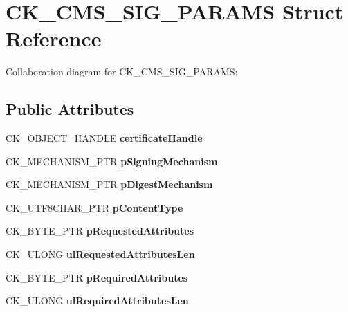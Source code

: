 \hypertarget{struct_c_k___c_m_s___s_i_g___p_a_r_a_m_s}{}\section{C\+K\+\_\+\+C\+M\+S\+\_\+\+S\+I\+G\+\_\+\+P\+A\+R\+A\+MS Struct Reference}
\label{struct_c_k___c_m_s___s_i_g___p_a_r_a_m_s}


Collaboration diagram for C\+K\+\_\+\+C\+M\+S\+\_\+\+S\+I\+G\+\_\+\+P\+A\+R\+A\+MS\+:
\subsection*{Public Attributes}
\begin{DoxyCompactItemize}
\item 
\mbox{\label{struct_c_k___c_m_s___s_i_g___p_a_r_a_m_s_af159e64a054b24fafda6eb8187d5177c}} 
C\+K\+\_\+\+O\+B\+J\+E\+C\+T\+\_\+\+H\+A\+N\+D\+LE {\bfseries certificate\+Handle}
\item 
\mbox{\label{struct_c_k___c_m_s___s_i_g___p_a_r_a_m_s_a1b49871315d18fd726c6871cd971236c}} 
C\+K\+\_\+\+M\+E\+C\+H\+A\+N\+I\+S\+M\+\_\+\+P\+TR {\bfseries p\+Signing\+Mechanism}
\item 
\mbox{\label{struct_c_k___c_m_s___s_i_g___p_a_r_a_m_s_a63ba4f2d4e7be8d102e93a286a1d7877}} 
C\+K\+\_\+\+M\+E\+C\+H\+A\+N\+I\+S\+M\+\_\+\+P\+TR {\bfseries p\+Digest\+Mechanism}
\item 
\mbox{\label{struct_c_k___c_m_s___s_i_g___p_a_r_a_m_s_a677aa9778cdf65f7ddd4ce4d687bb2dd}} 
C\+K\+\_\+\+U\+T\+F8\+C\+H\+A\+R\+\_\+\+P\+TR {\bfseries p\+Content\+Type}
\item 
\mbox{\label{struct_c_k___c_m_s___s_i_g___p_a_r_a_m_s_a3e8777dbb5a643832e3af176b148b8e0}} 
C\+K\+\_\+\+B\+Y\+T\+E\+\_\+\+P\+TR {\bfseries p\+Requested\+Attributes}
\item 
\mbox{\label{struct_c_k___c_m_s___s_i_g___p_a_r_a_m_s_af6078bfc01a13e7ae2556fb806000a4f}} 
C\+K\+\_\+\+U\+L\+O\+NG {\bfseries ul\+Requested\+Attributes\+Len}
\item 
\mbox{\label{struct_c_k___c_m_s___s_i_g___p_a_r_a_m_s_ab1e315c86bada47d945738b351936ca9}} 
C\+K\+\_\+\+B\+Y\+T\+E\+\_\+\+P\+TR {\bfseries p\+Required\+Attributes}
\item 
\mbox{\label{struct_c_k___c_m_s___s_i_g___p_a_r_a_m_s_a0849e6c4b7613787007c2b657f77810a}} 
C\+K\+\_\+\+U\+L\+O\+NG {\bfseries ul\+Required\+Attributes\+Len}
\end{DoxyCompactItemize}


